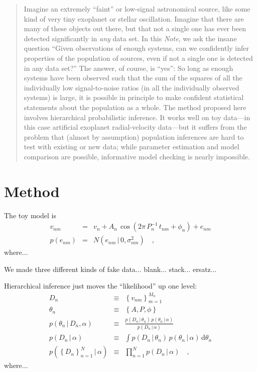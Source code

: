 \documentclass[12pt]{article}
\newcommand{\documentname}{\textsl{Note}}
\newcommand{\given}{\,|\,}
\newcommand{\dd}{\mathrm{d}}
\newcommand{\pdf}{p}
\newcommand{\setof}[1]{\left\{{#1}\right\}}
\newcommand{\data}{D_n}
\newcommand{\setofalldata}{\setof{\data}_{n=1}^N}
\newcommand{\parsymbol}{\theta}
\newcommand{\pars}{\parsymbol_n}
\newcommand{\hyperpars}{\alpha}
\newcommand{\amp}{A}
\newcommand{\period}{P}
\newcommand{\phase}{\phi}
\newcommand{\normal}{N}
\begin{document}
\begin{abstract}
Imagine an extremely ``faint'' or low-signal astronomical source, like
some kind of very tiny exoplanet or stellar oscillation.  Imagine that
there are many of these objects out there, but that not a single one
has ever been detected significantly in \emph{any} data set.  In this
\documentname, we ask the insane question ``Given observations of
enough systems, can we confidently infer properties of the population
of sources, even if not a single one is detected in any data set?''
The answer, of course, is ``yes'': So long as enough systems have been
observed such that the sum of the squares of all the individually low
signal-to-noise ratios (in all the individually observed systems) is
large, it is possible in principle to make confident statistical
statements about the population as a whole.  The method proposed here
involves hierarchical probabilistic inference.  It works well on toy
data---in this case artificial exoplanet radial-velocity data---but it
suffers from the problem that (almost by assumption) population
inferences are hard to test with existing or new data; while parameter
estimation and model comparison are possible, informative model
checking is nearly impossible.
\end{abstract}

\section{Method}

The toy model is
\begin{eqnarray}
v_{nm}
  &=&
v_n + \amp_n\,\cos(2\pi\,\period_n^{-1}\,t_{nm} + \phase_n) + e_{nm}
\\
p(e_{nm})
  &=&
\normal(e_{nm}\given 0,\sigma_{nm}^2)
\quad,
\end{eqnarray}
where...

We made three different kinds of fake data... blank... stack... ersatz...

Hierarchical inference just moves the ``likelihood'' up one level:
\begin{eqnarray}
\data
  &\equiv&
\setof{v_{nm}}_{m=1}^{M_n}
\\
\pars
  &\equiv&
\setof{\amp, \period, \phase}
\\
\pdf(\pars\given\data,\hyperpars)
  &\equiv&
\frac{\pdf(\data\given\pars)\,\pdf(\pars\given\hyperpars)}{\pdf(\data\given\hyperpars)}
\\
\pdf(\data\given\hyperpars)
  &\equiv&
\int \pdf(\data\given\pars)\,\pdf(\pars\given\hyperpars)\,\dd\pars
\\
\pdf(\setofalldata\given\hyperpars)
  &\equiv&
\prod_{n=1}^N \pdf(\data\given\hyperpars)
\quad,
\end{eqnarray}
where...
\end{document}
